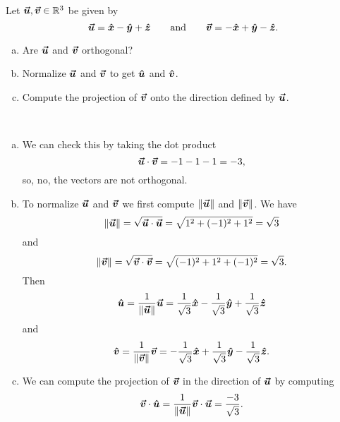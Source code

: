 \documentclass[12pt]{article} %
\begin{document}
\newpage
\begin{problem}
Let $\vecu,\vecv\in \R^3$ be given by
\[
\vecu = \xhat - \yhat + \zhat \qquad \textrm{and} \qquad \vecv = -\xhat + \yhat - \zhat.
\]
\begin{enumerate}[(a)]
    \item Are $\vecu$ and $\vecv$ orthogonal?
    \item Normalize $\vecu$ and $\vecv$ to get $\uhat$ and $\vhat$. 
    \item Compute the projection of $\vecv$ onto the direction defined by $\vecu$.
\end{enumerate}
\end{problem}
\begin{solution}~
    \begin{enumerate}[(a)]
        \item We can check this by taking the dot product
        \[
            \vecu \cdot \vecv = -1-1-1 = -3,
        \]
        so, no, the vectors are not orthogonal.
        \item To normalize $\vecu$ and $\vecv$ we first compute $\|\vecu\|$ and $\|\vecv\|$.  We have
        \[
            \|\vecu\| = \sqrt{\vecu \cdot \vecu} = \sqrt{1^2+(-1)^2+1^2}=\sqrt{3}
        \]
        and
        \[
            \|\vecv\| = \sqrt{\vecv \cdot \vecv} = \sqrt{(-1)^2+1^2 + (-1)^2} = \sqrt{3}.
        \]
        Then
        \[
            \uhat = \frac{1}{\|\vecu\|} \vecu = \frac{1}{\sqrt{3}} \xhat - \frac{1}{\sqrt{3}} \yhat + \frac{1}{\sqrt{3}} \zhat
        \]
        and
        \[
            \vhat = \frac{1}{\|\vecv\|} \vecv = -\frac{1}{\sqrt{3}} \xhat + \frac{1}{\sqrt{3}} \yhat - \frac{1}{\sqrt{3}} \zhat.
        \]
        \item We can compute the projection of $\vecv$ in the direction of $\vecu$ by computing
        \[
            \vecv \cdot \uhat = \frac{1}{\|\vecu\|} \vecv \cdot \vecu = \frac{-3}{\sqrt{3}}.
        \]
    \end{enumerate}
\end{solution}
\end{document}
